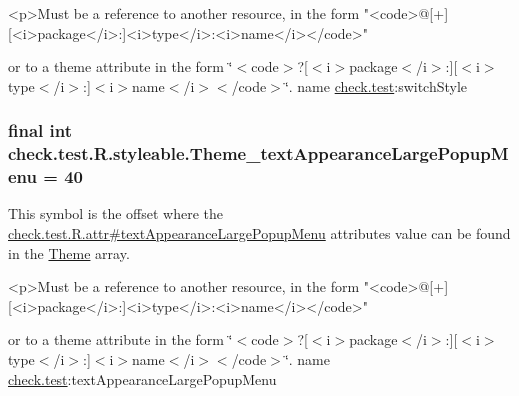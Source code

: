 \begin{DoxyVerb}      <p>Must be a reference to another resource, in the form "<code>@[+][<i>package</i>:]<i>type</i>:<i>name</i></code>"
\end{DoxyVerb}
 or to a theme attribute in the form \char`\"{}$<$code$>$?\mbox{[}$<$i$>$package$<$/i$>$\+:\mbox{]}\mbox{[}$<$i$>$type$<$/i$>$\+:\mbox{]}$<$i$>$name$<$/i$>$$<$/code$>$\char`\"{}.  name \hyperlink{namespacecheck_1_1test}{check.\+test}\+:switch\+Style \hypertarget{classcheck_1_1test_1_1_r_1_1styleable_a3c2ff2e7da8190569961b889ced77fcd}{}
\subsubsection[{Theme\+\_\+text\+Appearance\+Large\+Popup\+Menu}]{\setlength{\rightskip}{0pt plus 5cm}final int check.\+test.\+R.\+styleable.\+Theme\+\_\+text\+Appearance\+Large\+Popup\+Menu = 40\hspace{0.3cm}{\ttfamily [static]}}\label{classcheck_1_1test_1_1_r_1_1styleable_a3c2ff2e7da8190569961b889ced77fcd}
This symbol is the offset where the \hyperlink{classcheck_1_1test_1_1_r_1_1attr_a378cf97243180991de45fbf2a470b74f}{check.\+test.\+R.\+attr\#text\+Appearance\+Large\+Popup\+Menu} attribute\textquotesingle{}s value can be found in the \hyperlink{classcheck_1_1test_1_1_r_1_1styleable_acca726d02016a0cf607782ec3a436a81}{Theme} array.

\begin{DoxyVerb}      <p>Must be a reference to another resource, in the form "<code>@[+][<i>package</i>:]<i>type</i>:<i>name</i></code>"
\end{DoxyVerb}
 or to a theme attribute in the form \char`\"{}$<$code$>$?\mbox{[}$<$i$>$package$<$/i$>$\+:\mbox{]}\mbox{[}$<$i$>$type$<$/i$>$\+:\mbox{]}$<$i$>$name$<$/i$>$$<$/code$>$\char`\"{}.  name \hyperlink{namespacecheck_1_1test}{check.\+test}\+:text\+Appearance\+Large\+Popup\+Menu \hypertarget{classcheck_1_1test_1_1_r_1_1styleable_a1a1b8a87f2acabee24a7e564989bfbe3}{}
